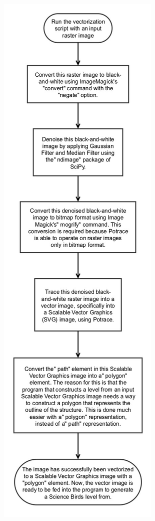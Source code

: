 \documentclass{dalthesis}
\begin{document}
\begin{figure}[H]
  \centering
  \includegraphics[width=\textwidth,height=\textheight,keepaspectratio]{process/science_birds_pcg-raster_to_vector-edited.png}
\end{figure}
\end{document}
